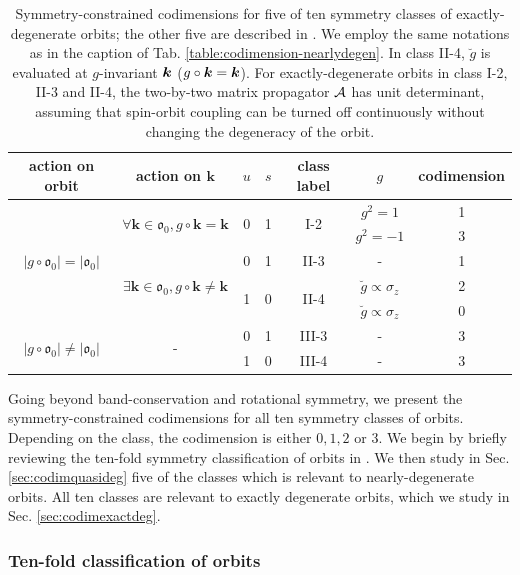 \documentclass[aps, showpacs, twocolumn, notitlepage, superscriptaddress]{revtex4-1}
\begin{document}
\begin{table}
\begin{tabular}{|c|c|c|c|c|c|c|}
\hline 
action on orbit  & action on $\boldsymbol{k}$  & $u$ & $s$  & class label & $g$  & codimension\tabularnewline
\hline 
\multirow{5}{*}{$|g\circ\mathfrak{o}_{0}|=|\mathfrak{o}_{0}|$} & \multirow{2}{*}{$\forall\boldsymbol{k}\in\mathfrak{o}_{0},g\circ\boldsymbol{k}=\boldsymbol{k}$} & \multirow{2}{*}{0} & \multirow{2}{*}{1} & \multirow{2}{*}{I-2} & $g^{2}=1$  & 1\tabularnewline
\cline{6-7} 
 &  &  &  &  & $g^{2}=-1$  & 3\tabularnewline
\cline{2-7} 
 & \multirow{3}{*}{$\exists\boldsymbol{k}\in\mathfrak{o}_{0},g\circ\boldsymbol{k}\neq\boldsymbol{k}$} & 0 & 1 & II-3 & - & 1\tabularnewline
\cline{3-7} 
 &  & \multirow{2}{*}{1} & \multirow{2}{*}{0} & \multirow{2}{*}{II-4} & $\breve{g}\propto\sigma_{z}$  & 2\tabularnewline
\cline{6-7} 
 &  &  &  &  & $\breve{g}\propto\sigma_{z}$  & 0\tabularnewline
\hline 
\multirow{2}{*}{$|g\circ\mathfrak{o}_{0}|\neq|\mathfrak{o}_{0}|$ } & \multirow{2}{*}{-} & 0 & 1 & III-3 & - & 3\tabularnewline
\cline{3-7} 
 &  & 1 & 0 & III-4 & - & 3\tabularnewline
\hline 
\end{tabular}
\caption{Symmetry-constrained codimensions for five of ten symmetry classes of exactly-degenerate orbits; the other five are described in . We employ the same notations as in the caption of Tab. \ref{table:codimension-nearlydegen}. In class II-4, $\breve g$ is evaluated at $g$-invariant $\boldsymbol{k}$ ($g\circ\boldsymbol{k}=\boldsymbol{k}$). For exactly-degenerate orbits in class I-2, II-3 and II-4, the two-by-two matrix propagator ${\cal A}$ has unit determinant, assuming that spin-orbit coupling can be turned off continuously without changing the degeneracy of the orbit.\cite{topoferm}\label{table:codimension-exactlydegen}}
\end{table}

Going beyond band-conservation and rotational symmetry, we present the symmetry-constrained codimensions for all ten symmetry classes of orbits\cite{topoferm}. Depending on the class, the codimension is either $0,1,2$ or $3$. We begin by briefly reviewing the ten-fold symmetry classification of orbits in . We then study in Sec. \ref{sec:codimquasideg} five of the classes which is relevant to nearly-degenerate orbits. All ten classes are relevant to exactly degenerate orbits, which we study in Sec. \ref{sec:codimexactdeg}.

\subsubsection{Ten-fold classification of orbits}\label{sec:reviewtenfold}
\end{document}
